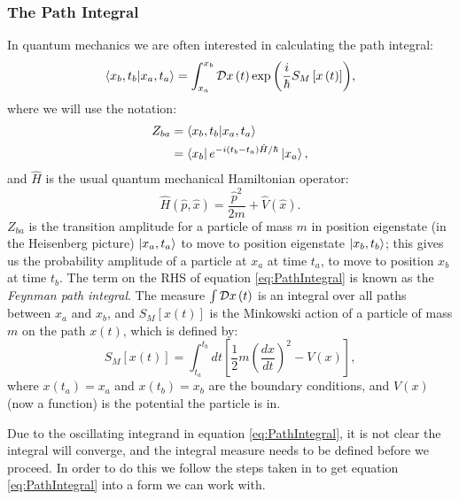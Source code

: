 \documentclass[12pt]{article}
\begin{document}
        \subsubsection{The Path Integral}
        \label{sec:QuantumMechanics}
        In quantum mechanics we are often interested in calculating the path integral:
        \begin{equation}
            \label{eq:PathIntegral}
            \braket{x_b,t_b|x_a,t_a} = \int_{x_a}^{x_b} {\cal D} x\left(t\right) \exp{\left(\frac{i}{\hbar} S_M\left[x\left(t\right)\right]\right)},
        \end{equation}
        where we will use the notation:
        \begin{align}
            \label{eq:PathIntegralZ_fi}
            Z_{ba} & = \braket{x_b,t_b|x_a,t_a} \\
            \label{eq:PathIntegralZ_fi2}
                   & = \bra{x_b}e^{-i\left(t_b-t_a\right)\hat{H}/\hbar}\ket{x_a},
        \end{align}
        and $\hat{H}$ is the usual quantum mechanical Hamiltonian operator:
        \begin{equation}
            \hat{H}\left(\hat{p},\hat{x}\right) = \frac{\hat{p}^2}{2m} + \hat{V}\left(\hat{x}\right).
        \end{equation} 
        $Z_{ba}$ is the transition amplitude for a particle of mass $m$ in position eigenstate (in the Heisenberg picture) $\ket{x_a,t_a}$ to move to position eigenstate $\ket{x_b,t_b}$; this gives us the probability amplitude of a particle at $x_a$ at time $t_a$, to move to position $x_b$ at time $t_b$. The term on the RHS of equation \ref{eq:PathIntegral} is known as the \textit{Feynman path integral}. The measure $\int {\cal D} x\left(t\right)$ is an integral over all paths between $x_a$ and $x_b$, and $S_M\left[x\left(t\right)\right]$ is the Minkowski action of a particle of mass $m$ on the path $x\left(t\right)$, which is defined by:
        \begin{equation}
            \label{eq:MinkowskiAction}
            S_M\left[x\left(t\right)\right] = \int_{t_a}^{t_b} dt \left[\frac{1}{2}m\left(\frac{dx}{dt}\right)^2 - V(x)\right],
        \end{equation}
        where $x\left(t_a\right) = x_a$ and $x\left(t_b\right) = x_b$ are the boundary conditions, and $V\left(x\right)$ (now a function) is the potential the particle is in.

        Due to the oscillating integrand in equation \ref{eq:PathIntegral}, it is not clear the integral will converge, and the integral measure needs to be defined before we proceed. In order to do this we follow the steps taken in \cite{creutz_freedman_1981} to get equation \ref{eq:PathIntegral} into a form we can work with.
\end{document}
